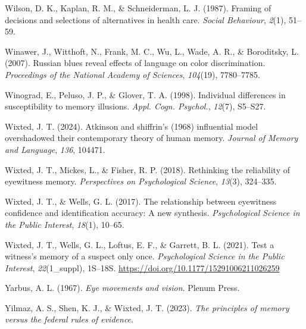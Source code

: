 \documentclass[
]{krantz}
\newlength{\cslhangindent}
\newlength{\cslentryspacingunit} %
\newenvironment{CSLReferences}[2] %
 {%
  \setlength{\parindent}{0pt}
  \ifodd #1
  \let\oldpar\par
  \def\par{\hangindent=\cslhangindent\oldpar}
  \fi
  \setlength{\parskip}{#2\cslentryspacingunit}
 }%
 {}
\begin{document}
\begin{CSLReferences}{1}{0}
\leavevmode{}%
Wilson, D. K., Kaplan, R. M., \& Schneiderman, L. J. (1987). Framing of decisions and selections of alternatives in health care. \emph{Social Behaviour}, \emph{2}(1), 51--59.

\leavevmode{}%
Winawer, J., Witthoft, N., Frank, M. C., Wu, L., Wade, A. R., \& Boroditsky, L. (2007). Russian blues reveal effects of language on color discrimination. \emph{Proceedings of the National Academy of Sciences}, \emph{104}(19), 7780--7785.

\leavevmode{}%
Winograd, E., Peluso, J. P., \& Glover, T. A. (1998). Individual differences in susceptibility to memory illusions. \emph{Appl. Cogn. Psychol.}, \emph{12}(7), S5--S27.

\leavevmode{}%
Wixted, J. T. (2024). Atkinson and shiffrin's (1968) influential model overshadowed their contemporary theory of human memory. \emph{Journal of Memory and Language}, \emph{136}, 104471.

\leavevmode{}%
Wixted, J. T., Mickes, L., \& Fisher, R. P. (2018). Rethinking the reliability of eyewitness memory. \emph{Perspectives on Psychological Science}, \emph{13}(3), 324--335.

\leavevmode{}%
Wixted, J. T., \& Wells, G. L. (2017). The relationship between eyewitness confidence and identification accuracy: A new synthesis. \emph{Psychological Science in the Public Interest}, \emph{18}(1), 10--65.

\leavevmode{}%
Wixted, J. T., Wells, G. L., Loftus, E. F., \& Garrett, B. L. (2021). Test a witness's memory of a suspect only once. \emph{Psychological Science in the Public Interest}, \emph{22}(1\_suppl), 1S--18S. \url{https://doi.org/10.1177/15291006211026259}

\leavevmode{}%
Yarbus, A. L. (1967). \emph{Eye movements and vision}. Plenum Press.

\leavevmode{}%
Yilmaz, A. S., Shen, K. J., \& Wixted, J. T. (2023). \emph{The principles of memory versus the federal rules of evidence}.

\end{CSLReferences}
\end{document}

